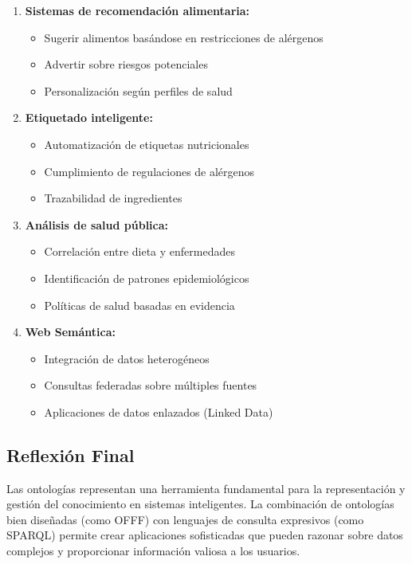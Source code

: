 \documentclass[12pt,a4paper]{article}
\begin{document}
\begin{enumerate}
    \item \textbf{Sistemas de recomendación alimentaria:}
    \begin{itemize}
        \item Sugerir alimentos basándose en restricciones de alérgenos
        \item Advertir sobre riesgos potenciales
        \item Personalización según perfiles de salud
    \end{itemize}
    
    \item \textbf{Etiquetado inteligente:}
    \begin{itemize}
        \item Automatización de etiquetas nutricionales
        \item Cumplimiento de regulaciones de alérgenos
        \item Trazabilidad de ingredientes
    \end{itemize}
    
    \item \textbf{Análisis de salud pública:}
    \begin{itemize}
        \item Correlación entre dieta y enfermedades
        \item Identificación de patrones epidemiológicos
        \item Políticas de salud basadas en evidencia
    \end{itemize}
    
    \item \textbf{Web Semántica:}
    \begin{itemize}
        \item Integración de datos heterogéneos
        \item Consultas federadas sobre múltiples fuentes
        \item Aplicaciones de datos enlazados (Linked Data)
    \end{itemize}
\end{enumerate}

\subsection{Reflexión Final}

Las ontologías representan una herramienta fundamental para la representación y gestión del conocimiento en sistemas inteligentes. La combinación de ontologías bien diseñadas (como OFFF) con lenguajes de consulta expresivos (como SPARQL) permite crear aplicaciones sofisticadas que pueden razonar sobre datos complejos y proporcionar información valiosa a los usuarios.
\end{document}
